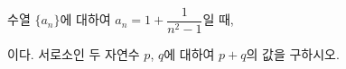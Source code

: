 수열 $\{a_n\}$에 대하여 $a_n=1+\dfrac{1}{n^2-1}$일 때, \par\smallskip{}\par\smallskip\noindent 이다. 서로소인 두 자연수 $p$, $q$에 대하여 $p+q$의 값을 구하시오.
